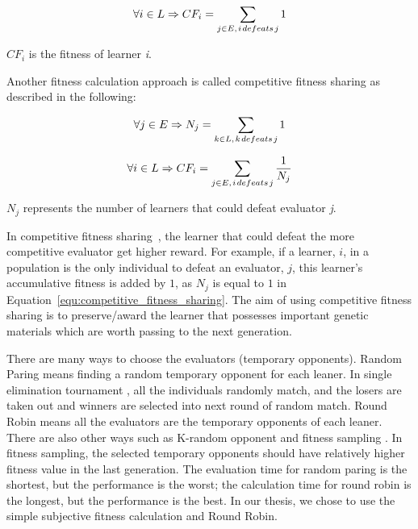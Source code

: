 \begin{equation}\label{equ:simple_fitness_calculation}
\forall i \in L \Rightarrow C{F_i} = \sum\limits_{j \in E,{\kern 1pt} i{\kern 1pt} defeats{\kern 1pt} j} 1
\end{equation}

$C{F_i}$ is the fitness of learner \textit{i}. 

Another fitness calculation approach is called competitive fitness sharing \cite{Rosin_1997} as described in the following:

\begin{equation}
\forall j \in E \Rightarrow {N_j} = \sum\limits_{k \in L,{\kern 1pt} k{\kern 1pt} defeats{\kern 1pt} j} 1
\end{equation}

\begin{equation}\label{equ:competitive_fitness_sharing}
\forall i \in L \Rightarrow C{F_i} = \sum\limits_{j \in E,{\kern 1pt} i{\kern 1pt} defeats{\kern 1pt} j} {\frac{1}{{{N_j}}}}
\end{equation}

${N_j}$ represents the number of learners that could defeat evaluator \textit{j}.  

In competitive fitness sharing~\cite{Rosin_1997}, the learner that could defeat the more competitive evaluator get higher reward. For example, if a learner, $i$, in a population is the only individual to defeat an evaluator, $j$, this learner's accumulative fitness is added by $1$, as $N_j$ is equal to $1$ in Equation~\eqref{equ:competitive_fitness_sharing}. The aim of using competitive fitness sharing is to preserve/award the learner that possesses important genetic materials which are worth passing to the next generation. 

There are many ways to choose the evaluators (temporary opponents). Random Paring \cite{Panait_2002} means finding a random temporary opponent for each leaner. In single elimination tournament \cite{Tan_2007}, all the individuals randomly match, and the losers are taken out and winners are selected into next round of random match. Round Robin \cite{Panait_2002} means all the evaluators are the temporary opponents of each leaner. There are also other ways such as K-random opponent \cite{Tan_2007} and fitness sampling \cite{Rosin_1997}. In fitness sampling, the selected temporary opponents should have relatively higher fitness value in the last generation. The evaluation time for random paring is the shortest, but the performance is the worst; the calculation time for round robin is the longest, but the performance is the best. In our thesis, we chose to use the simple subjective fitness calculation and Round Robin. 

